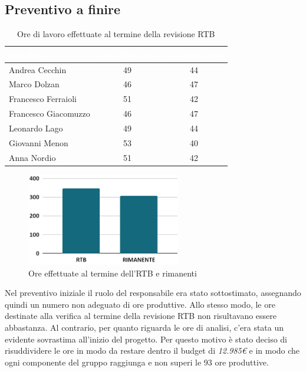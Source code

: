\subsection{Preventivo a finire} \label{sec:risuddivisione}
\setlength{\tabcolsep}{10pt}
\renewcommand{\arraystretch}{1.5}
\begin{table}[h!]
    \centering
    \begin{tabularx}{\textwidth}{| X | c | c |}
        \hline
        \rowcolor{headerrow} \textbf{\textcolor{white}{Membro}} & \textbf{\textcolor{white}{Ore effettuate}} & \textbf{\textcolor{white}{Ore rimanenti}} \\
        \hline
        Andrea Cecchin & 49 & 44 \\
        \hline
        Marco Dolzan & 46 & 47 \\
        \hline
        Francesco Ferraioli & 51 & 42 \\
        \hline  
        Francesco Giacomuzzo & 46 & 47 \\
        \hline
        Leonardo Lago & 49 & 44\\
        \hline
        Giovanni Menon & 53 & 40\\
        \hline
        Anna Nordio & 51 & 42\\
        \hline
    \end{tabularx} 
    \caption{Ore di lavoro effettuate al termine della revisione RTB}
    \label{tab:orefatte}
\end{table}
\begin{figure}[h!]
    \centering
    \includegraphics[width=0.6\textwidth]{oreTotaliRTB.png}
    \caption{Ore effettuate al termine dell'RTB e rimanenti}
    \label{fig:oreeffettiveRTB}
\end{figure}
\noindent Nel preventivo iniziale il ruolo del responsabile era stato sottostimato, assegnando quindi un numero non adeguato di ore produttive. Allo stesso modo, le ore destinate alla verifica al termine della revisione RTB non risultavano essere abbastanza. Al contrario, per quanto riguarda le ore di analisi, c'era stata un evidente sovrastima all'inizio del progetto. Per questo motivo è stato deciso di risuddividere le ore in modo da restare dentro il budget di \textit{12.985€} e in modo che ogni componente del gruppo raggiunga e non superi le 93 ore produttive.\\
